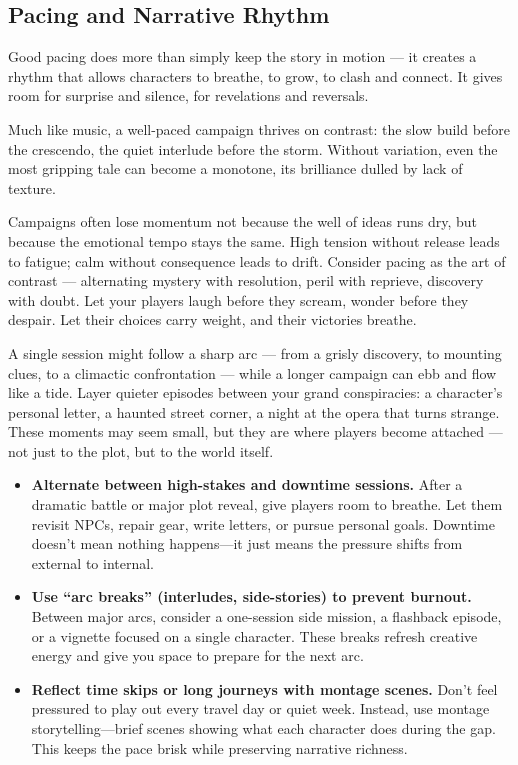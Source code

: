 \subsection*{Pacing and Narrative Rhythm}

Good pacing does more than simply keep the story in motion — it creates a rhythm that allows characters to breathe, to grow, to clash and connect. It gives room for surprise and silence, for revelations and reversals.

Much like music, a well-paced campaign thrives on contrast: the slow build before the crescendo, the quiet interlude before the storm. Without variation, even the most gripping tale can become a monotone, its brilliance dulled by lack of texture.

Campaigns often lose momentum not because the well of ideas runs dry, but because the emotional tempo stays the same. High tension without release leads to fatigue; calm without consequence leads to drift. Consider pacing as the art of contrast — alternating mystery with resolution, peril with reprieve, discovery with doubt. Let your players laugh before they scream, wonder before they despair. Let their choices carry weight, and their victories breathe.

A single session might follow a sharp arc — from a grisly discovery, to mounting clues, to a climactic confrontation — while a longer campaign can ebb and flow like a tide. Layer quieter episodes between your grand conspiracies: a character’s personal letter, a haunted street corner, a night at the opera that turns strange. These moments may seem small, but they are where players become attached — not just to the plot, but to the world itself.

\begin{itemize}
    \item \textbf{Alternate between high-stakes and downtime sessions.}  
    After a dramatic battle or major plot reveal, give players room to breathe. Let them revisit NPCs, repair gear, write letters, or pursue personal goals. Downtime doesn’t mean nothing happens—it just means the pressure shifts from external to internal.

    \item \textbf{Use “arc breaks” (interludes, side-stories) to prevent burnout.}  
    Between major arcs, consider a one-session side mission, a flashback episode, or a vignette focused on a single character. These breaks refresh creative energy and give you space to prepare for the next arc.

    \item \textbf{Reflect time skips or long journeys with montage scenes.}  
    Don’t feel pressured to play out every travel day or quiet week. Instead, use montage storytelling—brief scenes showing what each character does during the gap. This keeps the pace brisk while preserving narrative richness.
\end{itemize}

